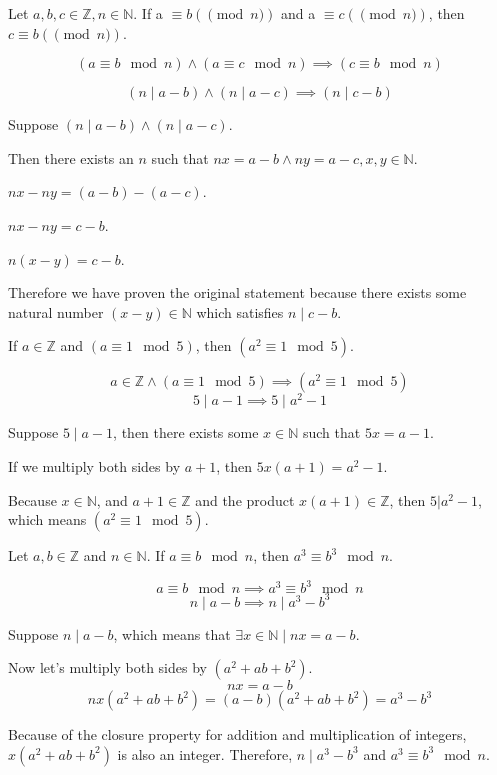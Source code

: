 \documentclass[openany, 12pt]{book}
\begin{document}
\begin{exercise}{}{}
	Let $a,b, c \in \mathbb{Z}, n \in \mathbb{N}$. If a $\equiv b (\pmod  n)$ and a $\equiv c (\pmod  n)$, then $c \equiv b (\pmod  n)$.
	\begin{alist}
		\item
		$$
			(a \equiv b \mod n) \land (a \equiv c \mod n)
			\implies
			(c \equiv b \mod n)
		$$
		\item
		$$
			(n \mid a - b) \land (n \mid a - c)
			\implies
			(n \mid c - b)
		$$
		\item Suppose $(n \mid a - b) \land (n \mid a - c)$.
		\item Then there exists an $n$ such that $nx = a - b \land ny = a - c, x, y \in \mathbb{N}$.
		\item $nx - ny = (a - b) - (a -c)$.
		\item $nx - ny = c - b$.
		\item $n(x - y) = c - b$.
		\item Therefore we have proven the original statement because there exists some
		natural number $(x-y)\in\mathbb{N}$ which satisfies $n \mid c -b$.
	\end{alist}
\end{exercise}

\begin{exercise}{}{}
	If $a \in \mathbb{Z}$ and $(a \equiv 1 \mod 5)$, then $(a^2 \equiv 1 \mod 5)$.
	\begin{alist}
		\item
		$$a \in \mathbb{Z} \land (a \equiv 1 \mod 5)
			\implies
			(a^2 \equiv 1 \mod 5)
		$$
		$$
			5 \mid a-1
			\implies
			5 \mid a^2-1
		$$
		\item Suppose $5\mid a-1$, then there exists some $x\in\mathbb{N}$ such that
		$5x=a-1.$
		\item If we multiply both sides by $a+1$, then $5x(a+1) = a^2 -1$.
		\item Because $x\in\mathbb{N}$, and $a+1\in\mathbb{Z}$ and the product
		$x(a+1)\in\mathbb{Z}$, then $5|a^2-1$, which means $(a^2 \equiv 1 \mod 5)$.
	\end{alist}
\end{exercise}

\begin{exercise}{}{}
	Let $a,b \in \mathbb{Z}$ and $n \in \mathbb{N}$. If $a
		\equiv b \mod n$, then $a^3 \equiv b^3 \mod n$.
	\begin{alist}
		\item
		$$a \equiv b \mod n
			\implies
			a^3 \equiv b^3 \mod n
		$$
		$$n\mid a - b
			\implies
			n \mid a^3 - b^3
		$$
		\item Suppose $n\mid a - b$, which means that $\exists x\in\mathbb{N} \mid nx = a-b$.
		\item Now let's multiply both sides by $(a^2 + ab + b^2)$.
		$$ nx = a-b$$
		$$ nx(a^2 + ab + b^2) = (a - b)(a^2 + ab + b^2) = a^3 - b^3$$
		\item
		Because of the closure property for addition and multiplication of integers,
		$x(a^2 + ab + b^2)$ is also an integer. Therefore,
		$n \mid a^3 - b^3$ and
		$a^3 \equiv b^3 \mod n$.
	\end{alist}
\end{exercise}
\end{document}
